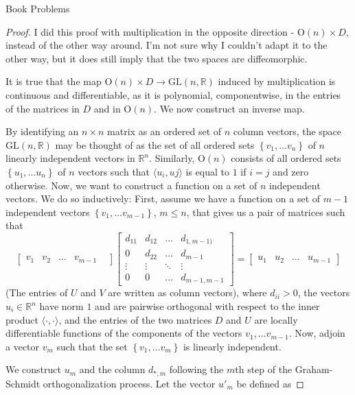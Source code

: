 \documentclass[12pt]{article}
\newcommand{\R}{\mathbb{R}}
\theoremstyle{definition}
\newenvironment{problem}[2][Problem]{\begin{trivlist}
\item[\hskip \labelsep {\bfseries #1}\hskip \labelsep {\bfseries #2.}]}{\end{trivlist}}
\begin{document}
\begin{section}{Book Problems}
\begin{problem}{2}
\end{problem}
\begin{proof}
	\par	I did this proof with multiplication in the opposite direction - $\text{O}(n) \times D$, instead of the other way around. I'm not sure why I couldn't adapt it to the other way, but it does still imply that the two spaces are diffeomorphic.
\par	It is true that the map $\text{O}(n) \times D \to \text{GL}(n, \R)$ induced by multiplication is continuous and differentiable, as it is polynomial, componentwise, in the entries of the matrices in $D$ and in $\text{O}(n)$. We now construct an inverse map.
	\par By identifying an $n\times n$ matrix as an ordered set of $n$ column vectors, the space $\text{GL}(n,\R)$ may be thought of as the set of all ordered sets $\left\{ v_1, \dots v_n \right\}$ of $n$ linearly independent vectors in $\R^n$. Similarly, $\text{O}(n)$ consists of all ordered sets $\left\{ u_1, \dots u_n \right\}$ of $n$ vectors such that $\langle u_i, uj \rangle$ is equal to $1$ if $i = j$ and zero otherwise. 
	Now, we want to construct a function on a set of $n$ independent vectors. We do so inductively: First, assume we have a function on a set of $m-1$ independent vectors $\left\{ v_1, \dots v_{m-1} \right\}$, $m \leq n$, that gives us a pair of matrices such that
	\[ \begin{bmatrix}
v_1&
v_2&
\dots&
v_{m-1}&
\end{bmatrix} \begin{bmatrix}
			d_{11} & d_{12} & \dots &  d_{1,m-1)}\\
			0 & d_{22} & \dots & d_{m-1} \\
			\vdots & \vdots & \ddots & \vdots \\			
			0 & 0 & \dots & d_{m-1,m-1}
\end{bmatrix}
= \begin{bmatrix}
	u_1 &u_2  &\dots  &u_{m-1}
\end{bmatrix}\]
(The entries of $U$ and $V$ are written as column vectors), where $d_{ii} > 0$, the vectors $u_i \in \R^{n}$ have norm $1$ and are pairwise orthogonal with respect to the inner product $\langle \cdot, \cdot\rangle$, and the entries of the two matrices $D$ and $U$ are locally differentiable functions of the components of the vectors $v_1, \dots v_{m-1}$. Now, adjoin a vector $v_m$ such that the set $\left\{ v_1, \dots v_m \right\}$ is linearly independent. 
\par We construct $u_m$ and the column $d_{*,  m}$ following the $m$th step of the Graham-Schmidt orthogonalization process. Let the vector $u'_m$ be defined as 

\end{proof}
\end{section}
\end{document}
